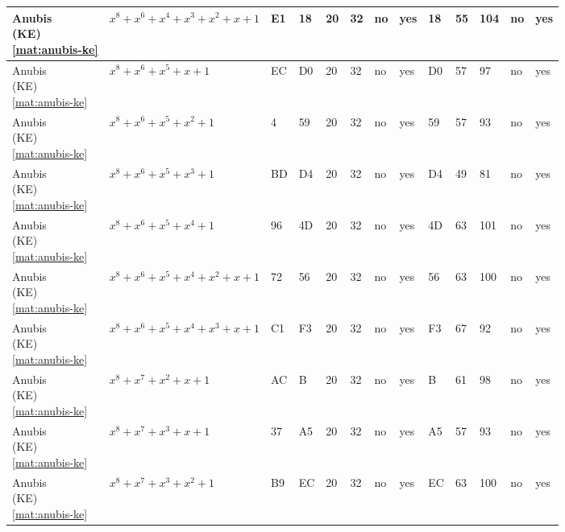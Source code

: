 \begin{tiny}
\begin{longtable}{|l|l|l|l|l|l|l|l|l|l|l|l|l|}
\shortstack{Anubis \\ (KE) \\ \eqref{mat:anubis-ke}} & $x^8 + x^6 + x^4 + x^3 + x^2 + x + 1$ & E1 & 18 & 20 & 32 & no & yes & 18 & 55 & 104 & no & yes \\ \hline
\shortstack{Anubis \\ (KE) \\ \eqref{mat:anubis-ke}} & $x^8 + x^6 + x^5 + x + 1$ & EC & D0 & 20 & 32 & no & yes & D0 & 57 & 97 & no & yes \\ \hline
\shortstack{Anubis \\ (KE) \\ \eqref{mat:anubis-ke}} & $x^8 + x^6 + x^5 + x^2 + 1$ & 4 & 59 & 20 & 32 & no & yes & 59 & 57 & 93 & no & yes \\ \hline
\shortstack{Anubis \\ (KE) \\ \eqref{mat:anubis-ke}} & $x^8 + x^6 + x^5 + x^3 + 1$ & BD & D4 & 20 & 32 & no & yes & D4 & 49 & 81 & no & yes \\ \hline
\shortstack{Anubis \\ (KE) \\ \eqref{mat:anubis-ke}} & $x^8 + x^6 + x^5 + x^4 + 1$ & 96 & 4D & 20 & 32 & no & yes & 4D & 63 & 101 & no & yes \\ \hline
\shortstack{Anubis \\ (KE) \\ \eqref{mat:anubis-ke}} & $x^8 + x^6 + x^5 + x^4 + x^2 + x + 1$ & 72 & 56 & 20 & 32 & no & yes & 56 & 63 & 100 & no & yes \\ \hline
\shortstack{Anubis \\ (KE) \\ \eqref{mat:anubis-ke}} & $x^8 + x^6 + x^5 + x^4 + x^3 + x + 1$ & C1 & F3 & 20 & 32 & no & yes & F3 & 67 & 92 & no & yes \\ \hline
\shortstack{Anubis \\ (KE) \\ \eqref{mat:anubis-ke}} & $x^8 + x^7 + x^2 + x + 1$ & AC & B & 20 & 32 & no & yes & B & 61 & 98 & no & yes \\ \hline
\shortstack{Anubis \\ (KE) \\ \eqref{mat:anubis-ke}} & $x^8 + x^7 + x^3 + x + 1$ & 37 & A5 & 20 & 32 & no & yes & A5 & 57 & 93 & no & yes \\ \hline
\shortstack{Anubis \\ (KE) \\ \eqref{mat:anubis-ke}} & $x^8 + x^7 + x^3 + x^2 + 1$ & B9 & EC & 20 & 32 & no & yes & EC & 63 & 100 & no & yes \\ \hline

\end{longtable}
\end{tiny}
